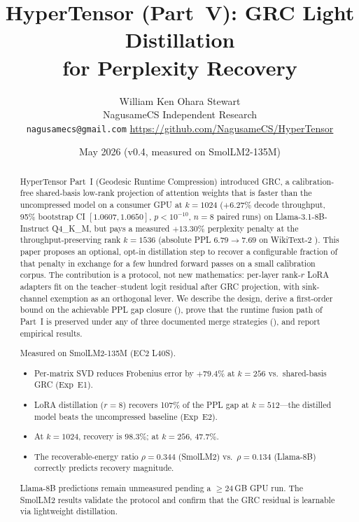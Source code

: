 \documentclass[11pt]{article}
\title{HyperTensor (Part~V): GRC Light Distillation\\for Perplexity Recovery}
\author{William Ken Ohara Stewart\\
\small NagusameCS Independent Research\\
\small \texttt{nagusamecs@gmail.com} \quad \url{https://github.com/NagusameCS/HyperTensor}}
\date{May 2026 (v0.4, measured on SmolLM2-135M)}
\begin{document}
\maketitle
\hypertensorbanner

\begin{abstract}
\noindent
HyperTensor Part~I (Geodesic Runtime Compression) introduced GRC, a calibration-free shared-basis low-rank
projection of attention weights that is faster than the uncompressed
model on a consumer GPU at $k{=}1024$ ($+6.27\%$ decode throughput,
95\% bootstrap CI $[1.0607,1.0650]$, $p<10^{-10}$, $n{=}8$ paired runs)
on Llama-3.1-8B-Instruct Q4\_K\_M, but pays a measured $+13.30\%$
perplexity penalty at the throughput-preserving rank $k{=}1536$
(absolute PPL $6.79\to 7.69$ on WikiText-2 \cite{merity2016wikitext}).
This paper proposes an optional, opt-in distillation step to
recover a configurable fraction of that penalty in exchange for a few
hundred forward passes on a small calibration corpus. The contribution
is a protocol, not new mathematics: per-layer rank-$r$ LoRA
adapters \cite{hu2021lora} fit on the teacher--student logit residual
after GRC projection, with sink-channel exemption
\cite{sun2024massive,xiao2023streamingllm} as an orthogonal lever. We
describe the design, derive a first-order bound on the achievable PPL
gap closure (), prove that the runtime fusion path
of Part~I is preserved under any of three documented merge strategies
(), and report empirical results.

Measured on SmolLM2-135M (EC2 L40S).
\begin{itemize}
\item Per-matrix SVD reduces Frobenius error by $+79.4\%$ at $k{=}256$
      vs.\ shared-basis GRC (Exp~E1).
\item LoRA distillation ($r{=}8$) recovers 107\% of the PPL gap
      at $k{=}512$---the distilled model beats the uncompressed baseline
      (Exp~E2).
\item At $k{=}1024$, recovery is $98.3\%$; at $k{=}256$, $47.7\%$.
\item The recoverable-energy ratio $\rho{=}0.344$ (SmolLM2) vs.\
      $\rho{=}0.134$ (Llama-8B) correctly predicts recovery magnitude.
\end{itemize}

Llama-8B predictions remain unmeasured pending a ${\ge}24$\,GB
GPU run.  The SmolLM2 results validate the protocol and confirm that
the GRC residual is learnable via lightweight distillation.
\end{abstract}
\end{document}
